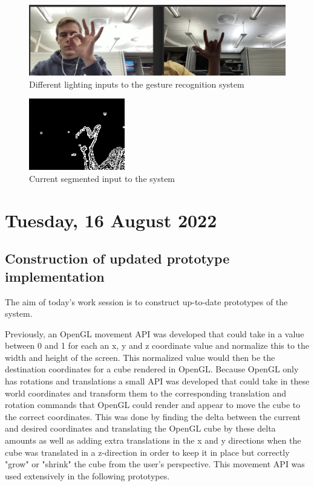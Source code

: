 \begin{figure}[h]
    \centering
    \includegraphics[width=1.0\linewidth]{figures/error_segmentation_2.png}
    \caption{Different lighting inputs to the gesture recognition system}
    \label{fig:error_segmentation_2}
\end{figure}

\begin{figure}[h]
    \centering
    \includegraphics[width=0.6\linewidth]{figures/error_segmentation.png}
    \caption{Current segmented input to the system}
    \label{fig:error_segmentation}
\end{figure}

\section[2022/08/16]{Tuesday, 16 August 2022}

\subsection{Construction of updated prototype implementation}

The aim of today's work session is to construct up-to-date prototypes of the system.

Previously, an OpenGL movement API was developed that could take in a value between 0 and 1 for each an x, y and z coordinate value and normalize this to the width and height of the screen. This normalized value would then be the destination coordinates for a cube rendered in OpenGL. Because OpenGL only has rotations and translations a small API was developed that could take in these world coordinates and transform them to the corresponding translation and rotation commands that OpenGL could render and appear to move the cube to the correct coordinates. This was done by finding the delta between the current and desired coordinates and translating the OpenGL cube by these delta amounts as well as adding extra translations in the x and y directions when the cube was translated in a z-direction in order to keep it in place but correctly "grow" or "shrink" the cube from the user's perspective. This movement API was used extensively in the following prototypes.

